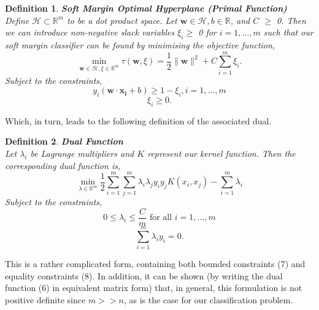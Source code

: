 \documentclass{article}
\newtheorem{definition}{Definition}[section]
\begin{document}
\begin{definition} \textbf{Soft Margin Optimal Hyperplane (Primal Function)} \cite{vapnik1999nature:ch5}\\
Define $\mathcal{H} \subset \mathbb{R}^m$ to be a dot product space. Let $\textbf{w} \in \mathcal{H}, b \in \mathbb{R}$, and $C$ $\geq$ 0. Then we can introduce non-negative slack variables $\xi_{i} \geq$ 0 for $i = 1, \ldots, m$ such that our soft margin classifier can be found by minimising the objective function,
\begin{equation}
    \min_{\textbf{w} \in \mathcal{H}, \xi \in \mathbb{R}^m} {\tau(\textbf{w}, \xi) = \frac{1}{2} \|\textbf{w}\|^2 + C \sum_{i=1}^{m} \xi_{i}}.
\end{equation}
Subject to the constraints,
\begin{equation}
    y_i (\textbf{w} \cdot \mathbf{x_{i}} + b) \geq 1  -\xi_{i} , i=1, \dots, m
\end{equation}
\begin{equation}
    \xi_{i} \geq 0.
\end{equation}
\end{definition}

Which, in turn, leads to the following definition of the associated dual. 
\begin{definition} \textbf{Dual Function} \cite{vapnik1999nature:ch5}\\
Let $\lambda_i$ be Lagrange multipliers and $K$ represent our kernel function. Then the corresponding dual function is,
\begin{equation}
    \min_{\lambda \in \mathbb{R}^m} {\frac{1}{2}} \sum_{i=1}^{m} \sum_{j=1}^{m} \lambda_{i} \lambda_{j} y_{i} y_{j} K(x_{i}, x_{j}) - \sum_{i=1}^{m} \lambda_{i}
\end{equation}
Subject to the constraints,
\begin{equation}
   0 \leq \lambda_{i} \leq \frac{C}{m} \text{ for all } i=1, \ldots, m 
\end{equation}
\begin{equation}
    \sum_{i=1}^{m}{\lambda_{i} y_{i} = 0}.
\end{equation}

\end{definition}

This is a rather complicated form, containing both bounded constraints (7) and equality constraints (8). In addition, it can be shown (by writing the dual function (6) in equivalent matrix form) that, in general, this formulation is not positive definite \cite{mangasarian1999successive} since $m >> n$, as is the case for our classification problem. \par
\end{document}
